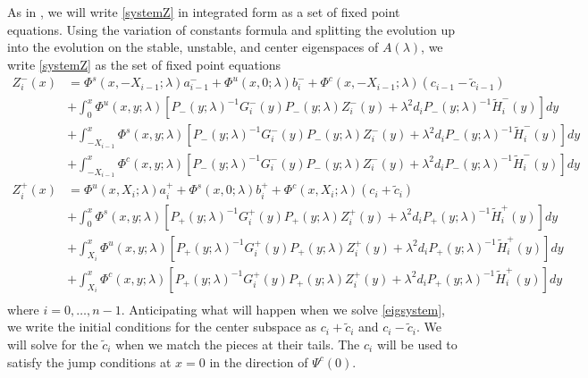\documentclass[thesis.tex]{subfiles}
\begin{document}
As in \cite{Sandstede1998}, we will write \eqref{systemZ} in integrated form as a set of fixed point equations. Using the variation of constants formula and splitting the evolution up into the evolution on the stable, unstable, and center eigenspaces of $A(\lambda)$, we write \eqref{systemZ} as the set of fixed point equations
\begin{equation}\label{Zfpeq}
\begin{aligned}
Z_i^-(x) &= \Phi^s(x, -X_{i-1}; \lambda) a_{i-1}^- + \Phi^u(x, 0; \lambda) b_i^- + \Phi^c(x, -X_{i-1}; \lambda) (c_{i-1} - \tilde{c}_{i-1})\ \\
&+ \int_0^x \Phi^u(x, y; \lambda)[P_-(y; \lambda)^{-1} G_i^-(y) P_-(y; \lambda)Z_i^-(y) + \lambda^2 d_i P_-(y; \lambda)^{-1} \tilde{H}_i^-(y)] dy \\
&+ \int_{-X_{i-1}}^x \Phi^s(x, y; \lambda)[P_-(y; \lambda)^{-1} G_i^-(y) P_-(y; \lambda)Z_i^-(y) + \lambda^2 d_i P_-(y; \lambda)^{-1} \tilde{H}_i^-(y)] dy \\
&+ \int_{-X_{i-1}}^x \Phi^c(x, y; \lambda) [P_-(y; \lambda)^{-1} G_i^-(y) P_-(y; \lambda)Z_i^-(y) + \lambda^2 d_i P_-(y; \lambda)^{-1} \tilde{H}_i^-(y)] dy  \\ 
Z_i^+(x) &= \Phi^u(x, X_i; \lambda) a_i^+ + \Phi^s(x, 0; \lambda) b_i^+ + \Phi^c(x, X_i; \lambda)(c_i + \tilde{c}_i) \\
&+ \int_0^x \Phi^s(x, y; \lambda) [P_+(y; \lambda)^{-1} G_i^+(y) P_+(y; \lambda) Z_i^+(y) + \lambda^2 d_i P_+(y; \lambda)^{-1} \tilde{H}_i^+(y)] dy \\
&+ \int_{X_i}^x \Phi^u(x, y; \lambda) [P_+(y; \lambda)^{-1} G_i^+(y) P_+(y; \lambda) Z_i^+(y) + \lambda^2 d_i P_+(y; \lambda)^{-1} \tilde{H}_i^+(y)] dy \\
&+ \int_{X_i}^x \Phi^c(x, y; \lambda) [P_+(y; \lambda)^{-1} G_i^+(y) P_+(y; \lambda) Z_i^+(y) + \lambda^2 d_i P_+(y; \lambda)^{-1} \tilde{H}_i^+(y)] dy \\
\end{aligned}
\end{equation}
where $i = 0, \dots, n-1$. Anticipating what will happen when we solve \cref{eigsystem}, we write the initial conditions for the center subspace as $c_i + \tilde{c}_i$ and $c_i - \tilde{c}_i$. We will solve for the $\tilde{c}_i$ when we match the pieces at their tails. The $c_i$ will be used to satisfy the jump conditions at $x = 0$ in the direction of $\Psi^c(0)$. 
\end{document}
